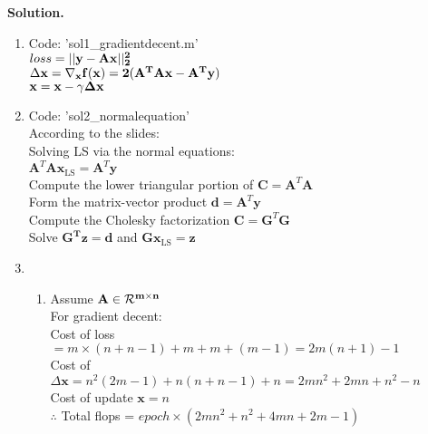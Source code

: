 \documentclass[english,onecolumn]{IEEEtran}
\begin{document}
\newpage

\textbf{Solution.}

\begin{enumerate}
    \item 
    Code: 'sol1\_gradientdecent.m' \\
    $loss = ||\bf{y - Ax} ||^2_2$\\
    $\Delta \bf{x} = \nabla_{{\bf x}} f(\mathbf{x}) = 2 (\bf{A^{T} A x - A^T y}) $\\
    $ \bf{x} = \bf{x} - \gamma \Delta \bf{x}  $ \\
    
    \item
    Code: 'sol2\_normalequation' \\
    According to the slides:\\
    Solving LS via the normal equations:\\
    $ \mathbf{A}^{T} \mathbf{A} \mathbf{x}_{\mathrm{L} \mathrm{S}}=\mathbf{A}^{T} \mathbf{y} $\\
    Compute the lower triangular portion of $\mathbf{C}=\mathbf{A}^{T} \mathbf{A}$\\
    Form the matrix-vector product $\mathbf{d}=\mathbf{A}^{T} \mathbf{y}$\\
    Compute the Cholesky factorization $\mathbf{C}=\mathbf{G}^{T} \mathbf{G}$\\
    Solve $\mathbf{G^{T} z}=\mathbf{d}$ and $\mathbf{G} \mathbf{x}_{\mathrm{LS}}=\mathbf{z}$\\
    
    
    \item
    
    \begin{enumerate}
        \item
        Assume $\bf{A} \in \mathcal{R}^{\bf{m} \times \bf{n}}$\\
        For gradient decent:\\
        Cost of loss $= m \times (n+n-1)+m+m+(m-1) = 2m(n+1)-1$ \\
        Cost of $\Delta \mathbf{x}=n^2 (2m-1)+n(n+n-1)+n = 2m n^2+2m n +n^2-n$ \\ 
        Cost of update $\mathbf{x} =n$ \\
        $\therefore$ Total flops = $ epoch \times (2m n^2 + n^2 + 4m n +2m-1 )$
        

\end{enumerate}
\end{enumerate}
\end{document}
